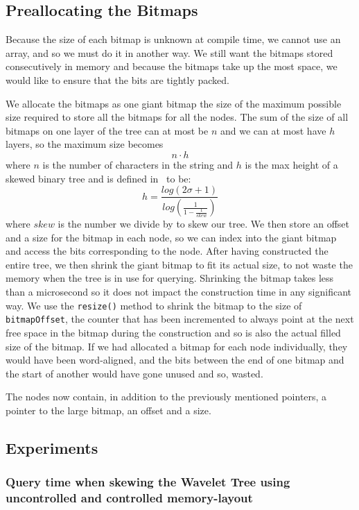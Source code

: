 \subsection{Preallocating the Bitmaps}
Because the size of each bitmap is unknown at compile time, we cannot use an array, and so we must do it in another way. We still want the bitmaps stored consecutively in memory and because the bitmaps take up the most space, we would like to ensure that the bits are tightly packed.

We allocate the bitmaps as one giant bitmap the size of the maximum possible size required to store all the bitmaps for all the nodes. The sum of the size of all bitmaps on one layer of the tree can at most be $n$ and we can at most have $h$ layers, so the maximum size becomes
\[n \cdot h\]
where $n$ is the number of characters in the string and $h$ is the max height of a skewed binary tree and is defined in~\cite{Nievergelt:1972:BST:800152.804906} to be:
\[ h = \frac{log(2\sigma+1)}{ log(\frac{1}{1-\frac{1}{skew}})}\]
where $skew$ is the number we divide by to skew our tree.  We then store an offset and a size for the bitmap in each node, so we can index into the giant bitmap and access the bits corresponding to the node.
After having constructed the entire tree, we then shrink the giant bitmap to fit its actual size, to not waste the memory when the tree is in use for querying. Shrinking the bitmap takes less than a microsecond so it does not impact the construction time in any significant way. We use the \texttt{resize()} method to shrink the bitmap to the size of \texttt{bitmapOffset}, the counter that has been incremented to always point at the next free space in the bitmap during the construction and so is also the actual filled size of the bitmap.
If we had allocated a bitmap for each node individually, they would have been word-aligned, and the bits between the end of one bitmap and the start of another would have gone unused and so, wasted.

The nodes now contain, in addition to the previously mentioned pointers, a pointer to the large bitmap, an offset and a size.



\subsection{Experiments}

\subsubsection{Query time when skewing the Wavelet Tree using uncontrolled and controlled memory-layout}

